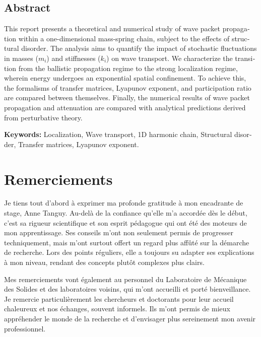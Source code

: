 \documentclass[11pt, a4paper, twoside]{article}
\begin{document}
\begin{otherlanguage}{english}
\subsection*{Abstract}
This report presents a theoretical and numerical study of wave packet propagation within a one-dimensional mass-spring chain, subject to the effects of structural disorder. The analysis aims to quantify the impact of stochastic fluctuations in masses ($m_i$) and stiffnesses ($k_i$) on wave transport. We characterize the transition from the ballistic propagation regime to the strong localization regime, wherein energy undergoes an exponential spatial confinement. To achieve this, the formalisms of transfer matrices, Lyapunov exponent, and participation ratio are compared between themselves. Finally, the numerical results of wave packet propagation and attenuation are compared with analytical predictions derived from perturbative theory.

\vspace{0.5cm}
\noindent\textbf{Keywords:} Localization, Wave transport, 1D harmonic chain, Structural disorder, Transfer matrices, Lyapunov exponent.
\end{otherlanguage}

\newpage

\section*{Remerciements}
Je tiens tout d'abord à exprimer ma profonde gratitude à mon encadrante de stage, Anne Tanguy. Au-delà de la confiance qu'elle m'a accordée dès le début, c'est sa rigueur scientifique et son esprit pédagogue qui ont été des moteurs de mon apprentissage. Ses conseils m'ont non seulement permis de progresser techniquement, mais m'ont surtout offert un regard plus affûté sur la démarche de recherche. Lors des points réguliers, elle a toujours su adapter ses explications à mon niveau, rendant des concepts plutôt complexes plus clairs.

Mes remerciements vont également au personnel du Laboratoire de Mécanique des Solides et des laboratoires voisins, qui m'ont accueilli et porté bienveillance. Je remercie particulièrement les chercheurs et doctorants pour leur accueil chaleureux et nos échanges, souvent informels. Ils m'ont permis de mieux appréhender le monde de la recherche et d'envisager plus sereinement mon avenir professionnel.
\end{document}
